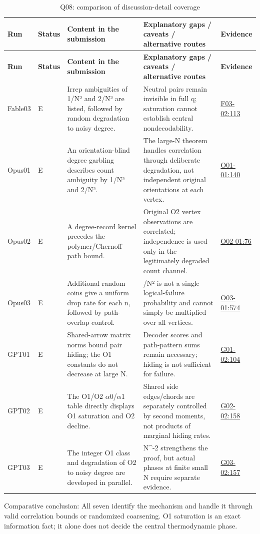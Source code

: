 \documentclass[11pt,a4paper]{article}
\begin{document}
{\fontsize{9.0}{12.6}\selectfont
\setlength{\tabcolsep}{2.5pt}
\begin{longtable}{>{\raggedright\arraybackslash}p{}>{\raggedright\arraybackslash}p{}>{\raggedright\arraybackslash}p{}>{\raggedright\arraybackslash}p{}>{\raggedright\arraybackslash}p{}}
\caption{Q08: comparison of discussion-detail coverage}\\
\toprule
\textbf{Run} & \textbf{Status} & \textbf{Content in the submission} & \textbf{Explanatory gaps /\allowbreak{} caveats /\allowbreak{} alternative routes} & \textbf{Evidence}\tabularnewline
\midrule
\endfirsthead
\toprule
\textbf{Run} & \textbf{Status} & \textbf{Content in the submission} & \textbf{Explanatory gaps /\allowbreak{} caveats /\allowbreak{} alternative routes} & \textbf{Evidence}\tabularnewline
\midrule
\endhead
{}Fable03 & E & Irrep ambiguities of 1/\allowbreak{}N² and 2/\allowbreak{}N² are listed,\allowbreak{} followed by random degradation to noisy degree. & Neutral pairs remain invisible in full q; saturation cannot establish central nondecodability. & \hyperref[src:F03-02]{F03-02:113}\tabularnewline
{}Opus01 & E & An orientation-blind degree garbling describes count ambiguity by 1/\allowbreak{}N² and 2/\allowbreak{}N². & The large-N theorem handles correlation through deliberate degradation,\allowbreak{} not independent original orientations at each vertex. & \hyperref[src:O01-01]{O01-01:140}\tabularnewline
{}Opus02 & E & A degree-record kernel precedes the polymer/\allowbreak{}Chernoff path bound. & Original O2 vertex observations are correlated; independence is used only in the legitimately degraded count channel. & \hyperref[src:O02-01]{O02-01:76}\tabularnewline
{}Opus03 & E & Additional random coins give a uniform drop rate for each n,\allowbreak{} followed by path-overlap control. & 1/\allowbreak{}N² is not a single logical-failure probability and cannot simply be multiplied over all vertices. & \hyperref[src:O03-01]{O03-01:574}\tabularnewline
{}GPT01 & E & Shared-arrow matrix norms bound pair hiding; the O1 constants do not decrease at large N. & Decoder scores and path-pattern sums remain necessary; hiding is not sufficient for failure. & \hyperref[src:G01-02]{G01-02:104}\tabularnewline
{}GPT02 & E & The O1/\allowbreak{}O2 \ensuremath{\alpha}0/\allowbreak{}\ensuremath{\alpha}1 table directly displays O1 saturation and O2 decline. & Shared side edges/\allowbreak{}chords are separately controlled by second moments,\allowbreak{} not products of marginal hiding rates. & \hyperref[src:G02-02]{G02-02:158}\tabularnewline
{}GPT03 & E & The integer O1 class and degradation of O2 to noisy degree are developed in parallel. & N\textasciicircum{}-2 strengthens the proof,\allowbreak{} but actual phases at finite small N require separate evidence. & \hyperref[src:G03-02]{G03-02:157}\tabularnewline
\bottomrule
\end{longtable}
}
Comparative conclusion: All seven identify the mechanism and handle it through valid correlation bounds or randomized coarsening. O1 saturation is an exact information fact; it alone does not decide the central thermodynamic phase.
\end{document}
